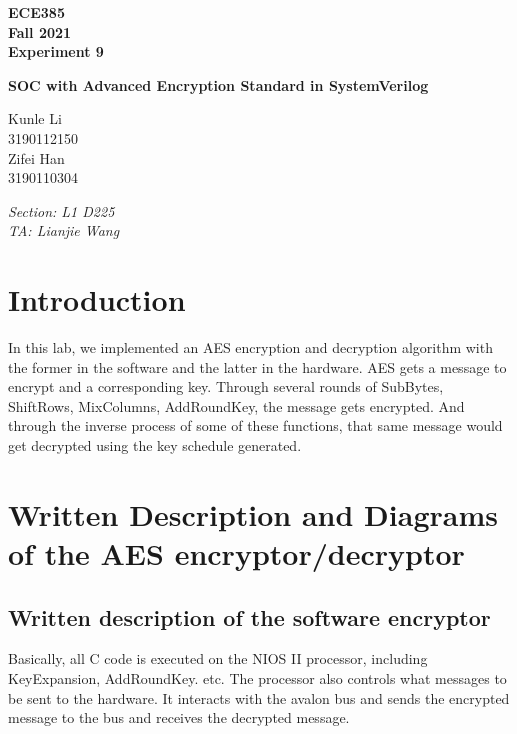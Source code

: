\documentclass[11pt]{article}
\begin{document}
\begin{titlepage}
    \centering
    {\Huge\bfseries ECE385\\\Large Fall 2021\\\Large Experiment 9}

    \vspace{1cm}
    
    {\LARGE\bfseries SOC with Advanced Encryption Standard in SystemVerilog}
    
    \vspace{2cm}
    
    {\Large Kunle Li\\3190112150\\Zifei Han\\3190110304}
    
    \vfill
    
    {\large\itshape Section: L1 D225\\TA: Lianjie Wang}
    \end{titlepage}

\tableofcontents
\section{Introduction}
In this lab, we implemented an AES encryption and decryption algorithm with the former in the software and the latter in the hardware. AES gets a message to encrypt and a corresponding key. Through several rounds of SubBytes, ShiftRows, MixColumns, AddRoundKey, the message gets encrypted. And through the inverse process of some of these functions, that same message would get decrypted using the key schedule generated.

\section{Written Description and Diagrams of the AES encryptor/decryptor}
\subsection{Written description of the software encryptor}
Basically, all C code is executed on the NIOS II processor, including KeyExpansion, AddRoundKey. etc. The processor also controls what messages to be sent to the hardware. It interacts with the avalon bus and sends the encrypted message to the bus and receives the decrypted message.
\end{document}
